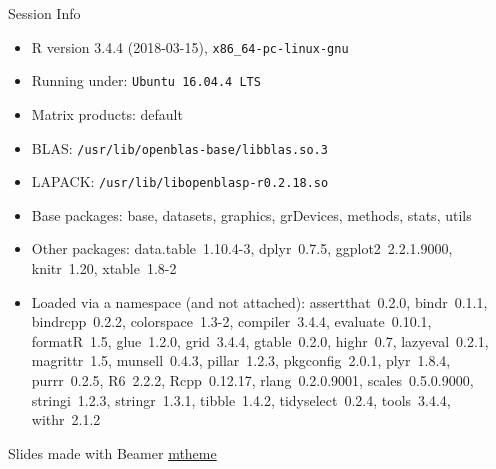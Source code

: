 \documentclass[10pt]{beamer}\usepackage[]{graphicx}\usepackage[]{color}
\begin{document}
\begin{frame}[fragile]{Session Info}
\begin{itemize}\raggedright
  \item R version 3.4.4 (2018-03-15), \verb|x86_64-pc-linux-gnu|
  \item Running under: \verb|Ubuntu 16.04.4 LTS|
  \item Matrix products: default
  \item BLAS: \verb|/usr/lib/openblas-base/libblas.so.3|
  \item LAPACK: \verb|/usr/lib/libopenblasp-r0.2.18.so|
  \item Base packages: base, datasets, graphics, grDevices, methods,
    stats, utils
  \item Other packages: data.table~1.10.4-3, dplyr~0.7.5,
    ggplot2~2.2.1.9000, knitr~1.20, xtable~1.8-2
  \item Loaded via a namespace (and not attached): assertthat~0.2.0,
    bindr~0.1.1, bindrcpp~0.2.2, colorspace~1.3-2, compiler~3.4.4,
    evaluate~0.10.1, formatR~1.5, glue~1.2.0, grid~3.4.4,
    gtable~0.2.0, highr~0.7, lazyeval~0.2.1, magrittr~1.5,
    munsell~0.4.3, pillar~1.2.3, pkgconfig~2.0.1, plyr~1.8.4,
    purrr~0.2.5, R6~2.2.2, Rcpp~0.12.17, rlang~0.2.0.9001,
    scales~0.5.0.9000, stringi~1.2.3, stringr~1.3.1, tibble~1.4.2,
    tidyselect~0.2.4, tools~3.4.4, withr~2.1.2
\end{itemize}

Slides made with Beamer \href{https://github.com/matze/mtheme}{mtheme}
\end{frame}
\end{document}
